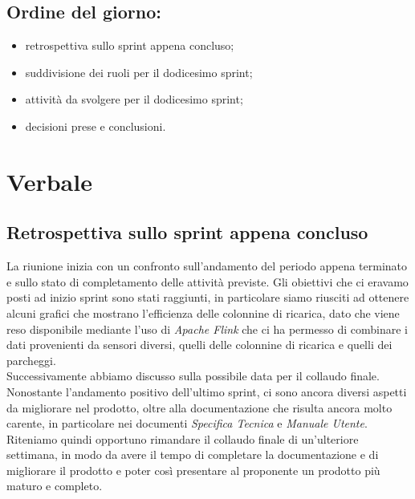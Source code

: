 \documentclass[italian,12pt]{article}
\begin{document}
\subsection*{Ordine del giorno:}
\begin{itemize}
	\item retrospettiva sullo sprint appena concluso;
	\item suddivisione dei ruoli per il dodicesimo sprint;
	\item attività da svolgere per il dodicesimo sprint;
	\item decisioni prese e conclusioni.
\end{itemize}


\newpage

\section{Verbale}

\subsection{Retrospettiva sullo sprint appena concluso}
La riunione inizia con un confronto sull'andamento del periodo appena terminato e sullo stato di completamento delle attività previste. Gli obiettivi che ci eravamo posti ad inizio sprint sono stati raggiunti, in particolare siamo riusciti ad ottenere alcuni grafici che mostrano l'efficienza delle colonnine di ricarica, dato che viene reso disponibile mediante l'uso di \textit{Apache Flink} che ci ha permesso di combinare i dati provenienti da sensori diversi, quelli delle colonnine di ricarica e quelli dei parcheggi. \\
Successivamente abbiamo discusso sulla possibile data per il collaudo finale. Nonostante l'andamento positivo dell'ultimo sprint, ci sono ancora diversi aspetti da migliorare nel prodotto, oltre alla documentazione che risulta ancora molto carente, in particolare nei documenti \textit{Specifica Tecnica} e \textit{Manuale Utente}. Riteniamo quindi opportuno rimandare il collaudo finale di un'ulteriore settimana, in modo da avere il tempo di completare la documentazione e di migliorare il prodotto e poter così presentare al proponente un prodotto più maturo e completo.
\end{document}
